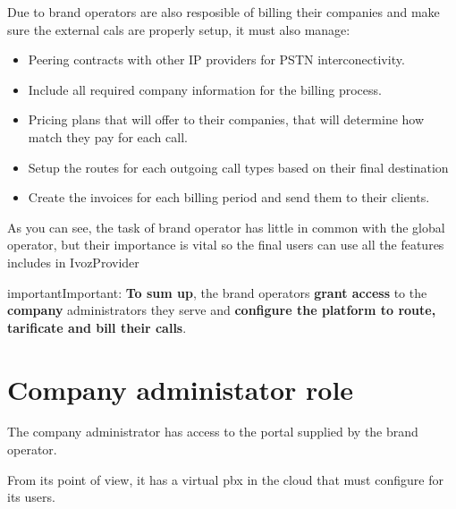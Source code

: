 \documentclass[letterpaper,10pt,english]{sphinxmanual}
\begin{document}
Due to brand operators are also resposible of billing their companies and
make sure the external cals are properly setup, it must also manage:
\begin{itemize}
\item {} 
Peering contracts with other IP providers for PSTN interconectivity.

\item {} 
Include all required company information for the billing process.

\item {} 
Pricing plans that will offer to their companies, that will determine how
match they pay for each call.

\item {} 
Setup the routes for each outgoing call types based on their final
destination

\item {} 
Create the invoices for each billing period and send them to their
clients.

\end{itemize}

As you can see, the task of brand operator has little in common with the
global operator, but their importance is vital so the final users can use
all the features includes in IvozProvider
\label{operation_roles/index:brand-responsibilities}
\begin{notice}{important}{Important:}
\textbf{To sum up}, the brand operators \textbf{grant access} to the
\textbf{company} administrators they serve and \textbf{configure the
platform to route, tarificate and bill their calls}.
\end{notice}


\section{Company administator role}
\label{operation_roles/index:company-administator-role}
The company administrator has access to the portal supplied by the brand
operator.

From its point of view, it has a virtual pbx in the cloud that must
configure for its users.
\end{document}
